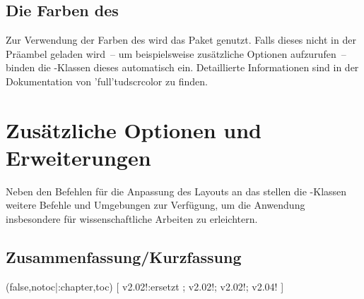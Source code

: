 \begin{DeclareEntity*}{}
\begin{DeclareEntity*}{}
\begin{DeclareEntity*}{}
\subsection{Die Farben des \CDs}

Zur Verwendung der Farben des \CDs wird das Paket  
genutzt. Falls dieses nicht in der Präambel geladen wird~-- um beispielsweise 
zusätzliche Optionen aufzurufen~-- binden die \TUDScript-Klassen dieses 
automatisch ein. Detaillierte Informationen sind in der Dokumentation von 
\Package'full'{tudscrcolor} zu finden.%
%



\section{Zusätzliche Optionen und Erweiterungen}

%
Neben den Befehlen für die Anpassung des Layouts an das \TUDCD stellen die 
\TUDScript-Klassen weitere Befehle und Umgebungen zur Verfügung, um die 
Anwendung insbesondere für wissenschaftliche Arbeiten zu erleichtern.



\subsection{%
  Zusammenfassung/Kurzfassung%
}

\begin{Declaration}
  {}
  (false,notoc|:chapter,toc)
[%
  v2.02!:ersetzt ;%
  v2.02!;%
  v2.02!;%
  v2.04!%
]


\end{Declaration}
\end{DeclareEntity*}
\end{DeclareEntity*}
\end{DeclareEntity*}

